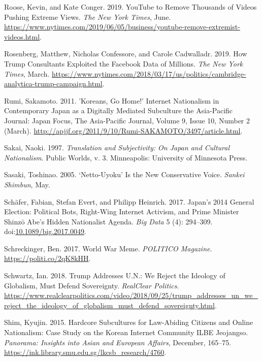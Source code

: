 \documentclass[10pt,british,A4paper,,openany]{memoir}
\begin{document}
\hypertarget{ref-roose_youtube_2019}{}
Roose, Kevin, and Kate Conger. 2019. YouTube to Remove Thousands of
Videos Pushing Extreme Views. \emph{The New York Times}, June.
\url{https://www.nytimes.com/2019/06/05/business/youtube-remove-extremist-videos.html}.

\hypertarget{ref-rosenberg_how_2019}{}
Rosenberg, Matthew, Nicholas Confessore, and Carole Cadwalladr. 2019.
How Trump Consultants Exploited the Facebook Data of Millions. \emph{The
New York Times}, March.
\url{https://www.nytimes.com/2018/03/17/us/politics/cambridge-analytica-trump-campaign.html}.

\hypertarget{ref-rumi_koreans_2011}{}
Rumi, Sakamoto. 2011. 'Koreans, Go Home!' Internet Nationalism in
Contemporary Japan as a Digitally Mediated Subculture the Asia-Pacific
Journal: Japan Focus, The Asia-Pacific Journal, Volume 9, Issue 10,
Number 2 (March).
\url{http://apjjf.org/2011/9/10/Rumi-SAKAMOTO/3497/article.html}.

\hypertarget{ref-sakai_translation_1997}{}
Sakai, Naoki. 1997. \emph{Translation and Subjectivity: On Japan and
Cultural Nationalism}. Public Worlds, v. 3. Minneapolis: University of
Minnesota Press.

\hypertarget{ref-sasaki_netto-uyoku_2005}{}
Sasaki, Toshinao. 2005. `Netto-Uyoku' Is the New Conservative Voice.
\emph{Sankei Shimbun}, May.

\hypertarget{ref-schafer_japans_2017}{}
Schäfer, Fabian, Stefan Evert, and Philipp Heinrich. 2017. Japan's 2014
General Election: Political Bots, Right-Wing Internet Activism, and
Prime Minister Shinzō Abe's Hidden Nationalist Agenda. \emph{Big Data} 5
(4): 294--309.
doi:\href{https://doi.org/10.1089/big.2017.0049}{10.1089/big.2017.0049}.

\hypertarget{ref-schreckinger_world_2017}{}
Schreckinger, Ben. 2017. World War Meme. \emph{POLITICO Magazine}.
\url{https://politi.co/2qK8kHH}.

\hypertarget{ref-schwartz_trump_2018}{}
Schwartz, Ian. 2018. Trump Addresses U.N.: We Reject the Ideology of
Globalism, Must Defend Sovereignty. \emph{RealClear Politics}.
\url{https://www.realclearpolitics.com/video/2018/09/25/trump_addresses_un_we_reject_the_ideology_of_globalism_must_defend_sovereignty.html}.

\hypertarget{ref-shim_hardcore_2015}{}
Shim, Kyujin. 2015. Hardcore Subcultures for Law-Abiding Citizens and
Online Nationalism: Case Study on the Korean Internet Community ILBE
Jeojangso. \emph{Panorama: Insights into Asian and European Affairs},
December, 165--75.
\url{https://ink.library.smu.edu.sg/lkcsb_research/4760}.
\end{document}
